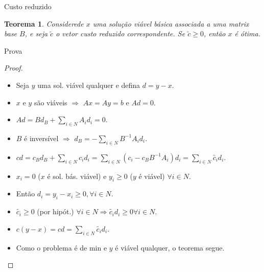 \documentclass[dvipsnames]{beamer}
\newtheorem{teorema}{Teorema}
\begin{document}
  \begin{frame}{Custo reduzido \hyperlink{dualrelax}{\beamergotobutton{$\leftarrow$}}}
    \hypertarget{provacustoreduzido}{}
    \begin{teorema}
      Considerede $x$ uma solução viável básica associada a uma matrix base $B$,
      e seja $\tilde{c}$ o vetor custo reduzido correspondente.
      Se $\tilde{c} \ge 0$, então $x$ é ótima.
      \end{teorema}
  \end{frame}

  \begin{frame}{Prova \hyperlink{dualrelax}{\beamergotobutton{$\leftarrow$}}}
    \begin{proof}
      \begin{itemize}
      \item <1-> Seja $y$ uma sol. viável qualquer e defina $d = y - x$.
      \item <2-> $x$ e $y$ são viáveis $\Rightarrow$ $Ax = Ay = b$ e $Ad = 0$.
      \item <3-> $Ad = Bd_{B} + \sum_{i \in N} A_{i}d_{i} = 0$.
      \item <4-> $B$ é inversível $\Rightarrow$ $d_{B} = - \sum_{i \in N} B^{-1}A_{i}d_{i}$.
      \item <5-> $cd = c_{B}d_{B} + \sum_{i \in N}c_{i}d_{i} = \sum_{i \in N}(c_i - c_{B}B^{-1}A_{i})d_i = \sum_{i \in N} \tilde{c_i}d_i$.
      \item <6-> $x_i = 0$ ($x$ é sol. bás. viável) e $y_i \ge 0$ ($y$ é viável) $\forall i \in N$.
      \item <7-> Então $d_i = y_i - x_i \ge 0, \forall i \in N$.
      \item <8-> $\tilde{c_i} \ge 0$ (por hipót.) $\forall i \in N \Rightarrow \tilde{c_i}d_i \ge 0 \forall i \in N$.
      \item <9-> $c(y - x) = cd = \sum_{i \in N} \tilde{c_i}d_i$.
        \item <10-> Como o problema é de min e $y$ é viável qualquer, o teorema segue.
        \end{itemize}
      \end{proof}
    \end{frame}

\end{document}
